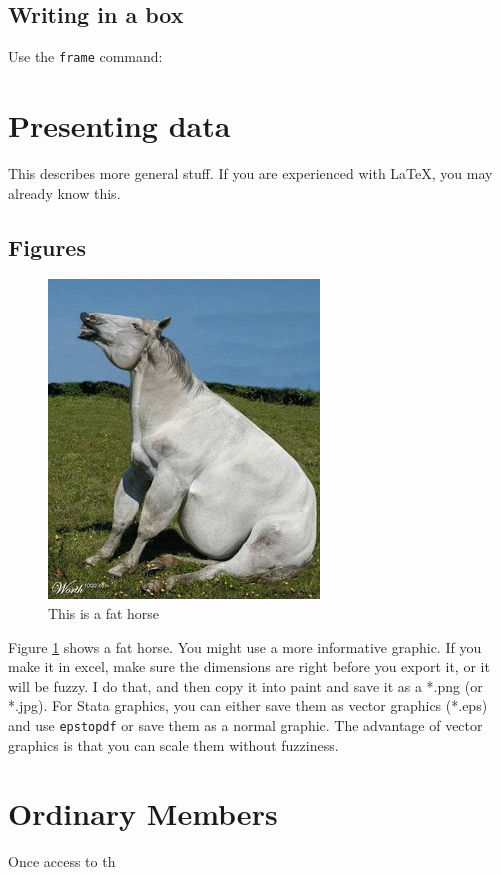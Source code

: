\documentclass[10pt]{article}
\begin{document}
\subsection{Writing in a box}

Use the \texttt{frame} command:


\section{Presenting data}

This describes more general stuff.  If you are experienced with \LaTeX, you may already know this.

\subsection{Figures}
\begin{figure}[h]
\centering
\caption{This is a fat horse}
\label{fathorse}
\includegraphics[scale=.5]{images/Fat+Horse.jpg}
\end{figure}

Figure \ref{fathorse} shows a fat horse.  You might use a more informative graphic.  If you make it in excel, make sure the dimensions are right before you export it, or it will be fuzzy.  I do that, and then copy it into paint and save it as a *.png (or *.jpg).  For Stata graphics, you can either save them as vector graphics (*.eps) and use \texttt{epstopdf} or save them as a normal graphic.  The advantage of vector graphics is that you can scale them without fuzziness.

\section{Ordinary Members}

Once access to th



\end{document}
